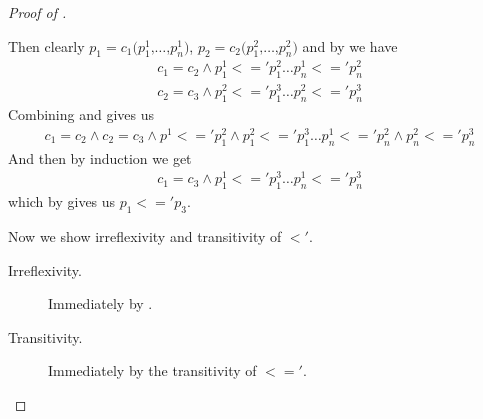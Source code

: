 \begin{proof}[Proof of {}]
\begin{description}
    Then clearly $p_1 = c_1 \texttt{(} p^1_1 \texttt{,} \ldots \texttt{,}
    p^1_n\texttt{)}$, $p_2 = c_2 \texttt{(}p^2_1 \texttt{,} \ldots \texttt{,}
    p^2_n\texttt{)}$ and by  we have
    \begin{eqnarray}[c]
      c_1 = c_2 \land p^1_1 <=' p^2_1 \ldots p^1_n <=' p^2_n \label{eq:pat-partial-order-weak-trans-part-proof-1}\\
      c_2 = c_3 \land p^2_1 <=' p^3_1 \ldots p^2_n <=' p^3_n \label{eq:pat-partial-order-weak-trans-part-proof-2}
    \end{eqnarray}
    Combining  and
     gives us
    \begin{eqnarray*}
      c_1 = c_2 \land c_2 = c_3 \land p^1 <=' p^2_1 \land p^2_1 <=' p^3_1 \ldots
      p^1_n <=' p^2_n \land p^2_n <=' p^3_n
    \end{eqnarray*}
    And then by induction we get
    \begin{eqnarray*}
      c_1 = c_3 \land p^1_1 <=' p^3_1 \ldots p^1_n <=' p^3_n
    \end{eqnarray*}
    which by  gives us $p_1 <=' p_3$.

  \end{description}

  Now we show irreflexivity and transitivity of $<'$.
  \begin{description}
  \item[Irreflexivity.]
    Immediately by .

  \item[Transitivity.]
    Immediately by the transitivity of $<='$.

  \end{description}
\end{proof}


